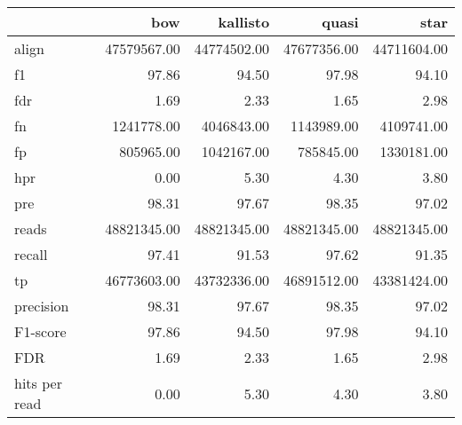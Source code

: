 \begin{tabular}{lrrrr}
\toprule
{} &          bow &     kallisto &        quasi &         star \\
\midrule
align         &  47579567.00 &  44774502.00 &  47677356.00 &  44711604.00 \\
f1            &        97.86 &        94.50 &        97.98 &        94.10 \\
fdr           &         1.69 &         2.33 &         1.65 &         2.98 \\
fn            &   1241778.00 &   4046843.00 &   1143989.00 &   4109741.00 \\
fp            &    805965.00 &   1042167.00 &    785845.00 &   1330181.00 \\
hpr           &         0.00 &         5.30 &         4.30 &         3.80 \\
pre           &        98.31 &        97.67 &        98.35 &        97.02 \\
reads         &  48821345.00 &  48821345.00 &  48821345.00 &  48821345.00 \\
recall        &        97.41 &        91.53 &        97.62 &        91.35 \\
tp            &  46773603.00 &  43732336.00 &  46891512.00 &  43381424.00 \\
precision     &        98.31 &        97.67 &        98.35 &        97.02 \\
F1-score      &        97.86 &        94.50 &        97.98 &        94.10 \\
FDR           &         1.69 &         2.33 &         1.65 &         2.98 \\
hits per read &         0.00 &         5.30 &         4.30 &         3.80 \\
\bottomrule
\end{tabular}
